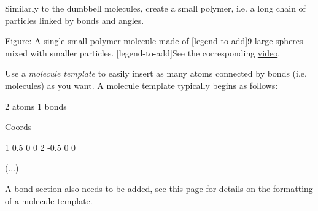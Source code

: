 \vspace{0.25cm} \noindent Similarly to the dumbbell molecules, create a small polymer,
i.e. a long chain of particles linked by bonds and angles.

\vspace{0.25cm} Figure: A single small polymer molecule made of
[legend-to-add]9 large spheres mixed with smaller particles. 
[legend-to-add]See the corresponding \href{https://youtu.be/LfqcfP3ZQcY}{video}.

\begin{tcolorbox}[colback=mylightblue!5!white,colframe=mylightblue!75!black,title=Hints]

\vspace{0.25cm} \noindent Use a \textit{molecule template} to easily insert as many atoms connected
by bonds (i.e. molecules) as you want. A molecule 
template typically begins as follows:

\begin{lcverbatim}
2 atoms
1 bonds

Coords

1 0.5 0 0
2 -0.5 0 0

(...)
\end{lcverbatim}

\noindent A bond section also needs to be added, see this
\href{https://docs.lammps.org/molecule.html}{page} for details on the formatting of a
molecule template.
\end{tcolorbox}

